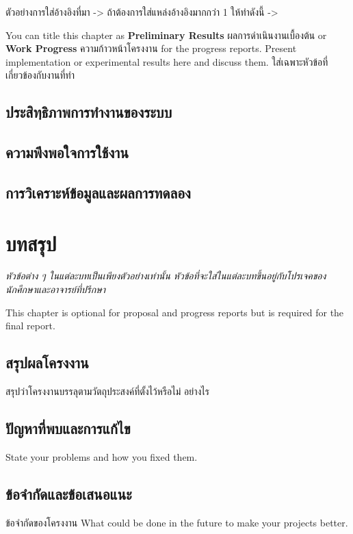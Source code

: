 \documentclass[12pt,oneside,openright,a4paper]{cpe-thai-project}
\begin{document}
ตัวอย่างการใส่อ้างอิงที่มา -> \cite{hypersense} ถ้าต้องการใส่แหล่งอ้างอิงมากกว่า 1 ให้ทำดังนี้ -> \cite{hypersense,bworld} 

You can title this chapter as \textbf{Preliminary Results} ผลการดำเนินงานเบื้องต้น or \textbf{Work Progress} ความก้าวหน้าโครงงาน for the progress reports. Present implementation or experimental results here and discuss them.
ใส่เฉพาะหัวข้อที่เกี่ยวข้องกับงานที่ทำ 

\section{ประสิทฺธิภาพการทำงานของระบบ} 
\section{ความพึงพอใจการใช้งาน}
\section{การวิเคราะห์ข้อมูลและผลการทดลอง}

\chapter{บทสรุป}


\emph{หัวข้อต่าง ๆ ในแต่ละบทเป็นเพียงตัวอย่างเท่านั้น หัวข้อที่จะใส่ในแต่ละบทขึ้นอยู่กับโปรเจคของนักศึกษาและอาจารย์ที่ปรึกษา}



This chapter is optional for proposal and progress reports but 
is required for the final report.

\section{สรุปผลโครงงาน}
สรุปว่าโครงงานบรรลุตามวัตถุประสงค์ที่ตั้งไว้หรือไม่ อย่างไร 

\section{ปัญหาที่พบและการแก้ไข}
State your problems and how you fixed them.

\section{ข้อจำกัดและข้อเสนอแนะ}
ข้อจำกัดของโครงงาน What could be done in the future to make your projects better.
\end{document}
